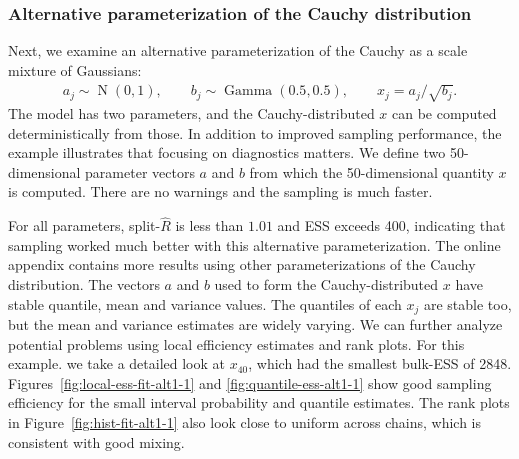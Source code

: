 \documentclass[american,]{article}
\DeclareMathOperator{\N}{N}
\DeclareMathOperator{\Gam}{Gamma}
\theoremstyle{definition}
\begin{document}
\hypertarget{alternative-parameterization-of-the-cauchy-distribution}{%
\subsubsection*{Alternative parameterization of the
Cauchy distribution}\label{alternative-parameterization-of-the-cauchy-distribution}}

Next, we examine an alternative parameterization  of the
Cauchy as a scale mixture of Gaussians:
\begin{align}
  a_j \sim  \N(0,1), \qquad
  b_j \sim  \Gam (0.5, 0.5), \qquad
  x_j =  a_j/\sqrt{b_j}.
\end{align}
The model has two parameters, and the Cauchy-distributed \(x\) can be
computed deterministically from those. In addition to improved sampling 
performance, the example illustrates that focusing on diagnostics matters.
We define two 50-dimensional parameter vectors $a$ and $b$ from which
the 50-dimensional quantity $x$ is computed. There are no warnings and
the sampling is much faster.


For all parameters, split-\(\widehat{R}\) is less than \(1.01\) and 
ESS exceeds 400, indicating that
sampling worked much better with this alternative parameterization.
The online appendix contains more results using other parameterizations 
of the Cauchy distribution. The vectors \(a\) and \(b\) used
to form the Cauchy-distributed \(x\) have stable quantile, mean and
variance values. The quantiles of each \(x_j\) are stable too, but the mean and variance estimates are widely varying.
%
We can further analyze potential problems using local efficiency
estimates and rank plots. For this example. we take a detailed look at 
\(x_{40}\), which had the smallest bulk-ESS of 2848.
%
Figures~\ref{fig:local-ess-fit-alt1-1} and
\ref{fig:quantile-ess-alt1-1} show good sampling efficiency for the
small interval probability and quantile estimates.
%
The rank plots in Figure~\ref{fig:hist-fit-alt1-1} also look close to
uniform across chains, which is consistent with good mixing.
\end{document}
